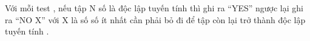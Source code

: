 Với mỗi test , nếu tập N số là độc lập tuyến tính thì ghi ra “YES” ngược lại ghi ra “NO X” với X là số số ít nhất cần phải bỏ đi để tập còn lại trở thành độc lập tuyến tính .  

\